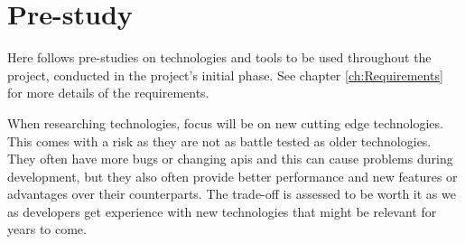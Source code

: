 \chapter{Pre-study}
\label{ch:preStudy}
Here follows pre-studies on technologies and tools to be used throughout the project, conducted in the project's initial phase.
See chapter \ref{ch:Requirements} for more details of the requirements.

When researching technologies, focus will be on new cutting edge technologies.
This comes with a risk as they are not as battle tested as older technologies.
They often have more bugs or changing \glspl{api} and this can cause problems during development, but they also often provide better performance and new features or advantages over their counterparts.
The trade-off is assessed to be worth it as we as developers get experience with new technologies that might be relevant for years to come.











